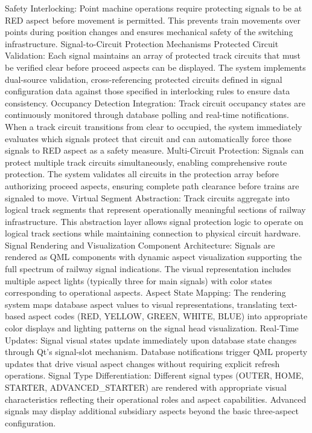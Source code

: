 Safety Interlocking: Point machine operations require protecting signals to be at RED aspect before movement is permitted. This prevents train movements over points during position changes and ensures mechanical safety of the switching infrastructure.
Signal-to-Circuit Protection Mechanisms
Protected Circuit Validation: Each signal maintains an array of protected track circuits that must be verified clear before proceed aspects can be displayed. The system implements dual-source validation, cross-referencing protected circuits defined in signal configuration data against those specified in interlocking rules to ensure data consistency.
Occupancy Detection Integration: Track circuit occupancy states are continuously monitored through database polling and real-time notifications. When a track circuit transitions from clear to occupied, the system immediately evaluates which signals protect that circuit and can automatically force those signals to RED aspect as a safety measure.
Multi-Circuit Protection: Signals can protect multiple track circuits simultaneously, enabling comprehensive route protection. The system validates all circuits in the protection array before authorizing proceed aspects, ensuring complete path clearance before trains are signaled to move.
Virtual Segment Abstraction: Track circuits aggregate into logical track segments that represent operationally meaningful sections of railway infrastructure. This abstraction layer allows signal protection logic to operate on logical track sections while maintaining connection to physical circuit hardware.
Signal Rendering and Visualization
Component Architecture: Signals are rendered as QML components with dynamic aspect visualization supporting the full spectrum of railway signal indications. The visual representation includes multiple aspect lights (typically three for main signals) with color states corresponding to operational aspects.
Aspect State Mapping: The rendering system maps database aspect values to visual representations, translating text-based aspect codes (RED, YELLOW, GREEN, WHITE, BLUE) into appropriate color displays and lighting patterns on the signal head visualization.
Real-Time Updates: Signal visual states update immediately upon database state changes through Qt's signal-slot mechanism. Database notifications trigger QML property updates that drive visual aspect changes without requiring explicit refresh operations.
Signal Type Differentiation: Different signal types (OUTER, HOME, STARTER, ADVANCED_STARTER) are rendered with appropriate visual characteristics reflecting their operational roles and aspect capabilities. Advanced signals may display additional subsidiary aspects beyond the basic three-aspect configuration.
